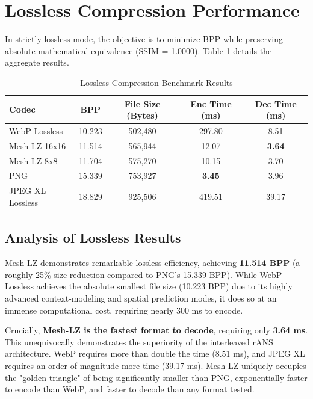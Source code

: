 \section{Lossless Compression Performance}

In strictly lossless mode, the objective is to minimize BPP while preserving absolute mathematical equivalence (SSIM = 1.0000). Table \ref{tab:lossless_bench} details the aggregate results.

\begin{table}[h!]
\centering
\begin{tabular}{|l|c|c|c|c|}
\hline
\textbf{Codec} & \textbf{BPP} & \textbf{File Size (Bytes)} & \textbf{Enc Time (ms)} & \textbf{Dec Time (ms)} \\
\hline
WebP Lossless & 10.223 & 502,480 & 297.80 & 8.51 \\
Mesh-LZ 16x16 & 11.514 & 565,944 & 12.07 & \textbf{3.64} \\
Mesh-LZ 8x8 & 11.704 & 575,270 & 10.15 & 3.70 \\
PNG & 15.339 & 753,927 & \textbf{3.45} & 3.96 \\
JPEG XL Lossless & 18.829 & 925,506 & 419.51 & 39.17 \\
\hline
\end{tabular}
\caption{Lossless Compression Benchmark Results}
\label{tab:lossless_bench}
\end{table}

\subsection{Analysis of Lossless Results}
Mesh-LZ demonstrates remarkable lossless efficiency, achieving \textbf{11.514 BPP} (a roughly 25\% size reduction compared to PNG's 15.339 BPP). While WebP Lossless achieves the absolute smallest file size (10.223 BPP) due to its highly advanced context-modeling and spatial prediction modes, it does so at an immense computational cost, requiring nearly 300 ms to encode.

Crucially, \textbf{Mesh-LZ is the fastest format to decode}, requiring only \textbf{3.64 ms}. This unequivocally demonstrates the superiority of the interleaved rANS architecture. WebP requires more than double the time (8.51 ms), and JPEG XL requires an order of magnitude more time (39.17 ms). Mesh-LZ uniquely occupies the "golden triangle" of being significantly smaller than PNG, exponentially faster to encode than WebP, and faster to decode than any format tested.

